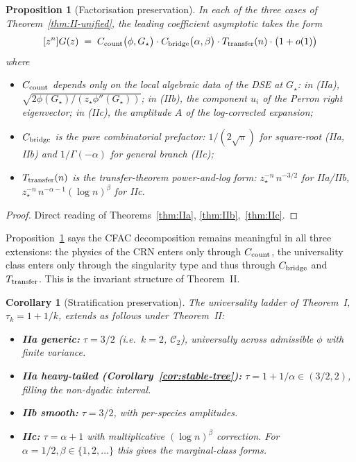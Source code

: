 \documentclass[11pt,a4paper]{article}
\newcommand{\Cstr}[1]{\mathcal{C}_{#1}}
\theoremstyle{plain}
\newtheorem{proposition}[theorem]{Proposition}
\newtheorem{corollary}[theorem]{Corollary}
\theoremstyle{definition}
\begin{document}
\begin{proposition}[Factorisation preservation]
\label{prop:factor}
In each of the three cases of Theorem~\ref{thm:II-unified}, the
leading coefficient asymptotic takes the form
\begin{equation}
\label{eq:unified-factor}
  [z^n] G(z) \;=\; C_{\rm count}\bigl(\phi, G_\star\bigr)
   \cdot C_{\rm bridge}\bigl(\alpha, \beta\bigr)
   \cdot T_{\rm transfer}(n)
   \cdot \bigl(1 + o(1)\bigr)
\end{equation}
where
\begin{itemize}[leftmargin=1.4em,itemsep=1pt]
  \item $C_{\rm count}$ depends only on the local algebraic data of
    the DSE at $G_\star$: in (IIa), $\sqrt{2\phi(G_\star)/(z_\star\phi''(G_\star))}$;
    in (IIb), the component $u_i$ of the Perron right eigenvector;
    in (IIc), the amplitude $A$ of the log-corrected expansion;
  \item $C_{\rm bridge}$ is the pure combinatorial prefactor:
    $1/(2\sqrt{\pi})$ for square-root (IIa, IIb) and $1/\Gamma(-\alpha)$
    for general branch (IIc);
  \item $T_{\rm transfer}(n)$ is the transfer-theorem power-and-log
    form: $z_\star^{-n}\, n^{-3/2}$ for IIa/IIb,
    $z_\star^{-n}\, n^{-\alpha-1}(\log n)^\beta$ for IIc.
\end{itemize}
\end{proposition}

\begin{proof}
Direct reading of Theorems~\ref{thm:IIa}, \ref{thm:IIb},~\ref{thm:IIc}.
\end{proof}

Proposition~\ref{prop:factor} says the CFAC decomposition remains
meaningful in all three extensions: the physics of the CRN enters
only through $C_{\rm count}$, the universality class enters only
through the singularity type and thus through $C_{\rm bridge}$ and
$T_{\rm transfer}$.  This is the invariant structure of Theorem~II.

\begin{corollary}[Stratification preservation]
\label{cor:strat}
The universality ladder of Theorem~I, $\tau_k = 1 + 1/k$, extends as
follows under Theorem~II:
\begin{itemize}[leftmargin=1.4em,itemsep=1pt]
  \item \textbf{IIa generic:} $\tau = 3/2$ (i.e.\ $k = 2$, $\Cstr{2}$),
    universally across admissible $\phi$ with finite variance.
  \item \textbf{IIa heavy-tailed (Corollary~\ref{cor:stable-tree}):}
    $\tau = 1 + 1/\alpha \in (3/2, 2)$, filling the non-dyadic interval.
  \item \textbf{IIb smooth:} $\tau = 3/2$, with per-species amplitudes.
  \item \textbf{IIc:} $\tau = \alpha + 1$ with multiplicative $(\log n)^\beta$
    correction.  For $\alpha = 1/2, \beta \in \{1,2,\dots\}$ this gives
    the marginal-class forms.
\end{itemize}
\end{corollary}
\end{document}
